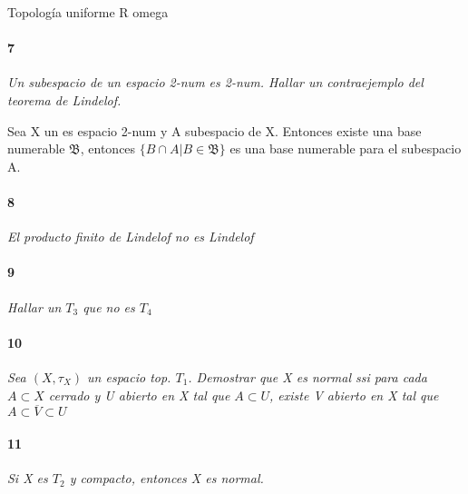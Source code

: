 \documentclass[12pt]{article}
\begin{document}
Topología uniforme R omega
\paragraph{7}
\textit{Un subespacio de un espacio 2-num es 2-num. Hallar un contraejemplo del teorema de Lindelof.}

Sea X un es espacio 2-num y A subespacio de X. Entonces existe una base numerable $\mathfrak{B}$, entonces $\{B\cap A | B\in\mathfrak{B}\}$ es una base numerable para el subespacio A.
\paragraph{8}
\textit{El producto finito de Lindelof no es Lindelof}

\paragraph{9}
\textit{Hallar un $T_3$ que no es $T_4$}

\paragraph{10}
\textit{Sea $(X,\tau_X)$ un  espacio top. $T_1$. Demostrar que X es normal ssi para cada $A\subset X$ cerrado y U abierto en X tal que $A\subset U$, existe V abierto en X tal que $A\subset\overline{V}\subset U$}

\paragraph{11}
\textit{Si X es $T_2$ y compacto, entonces X es normal.}
\end{document}
